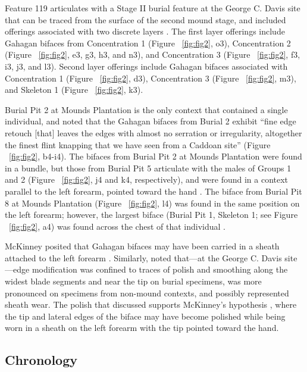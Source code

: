 \documentclass[review]{elsarticle}
\begin{document}
Feature 119 \citep[Figure 13-18]{RN808} articulates with a Stage II burial feature at the George C. Davis site that can be traced from the surface of the second mound stage, and included offerings associated with two discrete layers \citep{RN808,RN5050,RN806}. The first layer offerings include Gahagan bifaces from Concentration 1 (Figure ~\ref{fig:fig2}, o3), Concentration 2 (Figure ~\ref{fig:fig2}, e3, g3, h3, and n3), and Concentration 3 (Figure ~\ref{fig:fig2}, f3, i3, j3, and l3). Second layer offerings include Gahagan bifaces associated with Concentration 1 (Figure ~\ref{fig:fig2}, d3), Concentration 3 (Figure ~\ref{fig:fig2}, m3), and Skeleton 1 (Figure ~\ref{fig:fig2}, k3). 

Burial Pit 2 at Mounds Plantation is the only context that contained a single individual, and \citet[97]{RN11561} noted that the Gahagan bifaces from Burial 2 exhibit “fine edge retouch [that] leaves the edges with almost no serration or irregularity, altogether the finest flint knapping that we have seen from a Caddoan site” (Figure ~\ref{fig:fig2}, b4-i4). The bifaces from Burial Pit 2 at Mounds Plantation were found in a bundle, but those from Burial Pit 5 articulate with the males of Groups 1 and 2 (Figure ~\ref{fig:fig2}, j4 and k4, respectively), and were found in a context parallel to the left forearm, pointed toward the hand \citep[Figure 5]{RN11561}. The biface from Burial Pit 8 at Mounds Plantation (Figure ~\ref{fig:fig2}, l4) was found in the same position on the left forearm; however, the largest biface (Burial Pit 1, Skeleton 1; see Figure ~\ref{fig:fig2}, a4) was found across the chest of that individual \citep{RN11561}.

McKinney posited that Gahagan bifaces may have been carried in a sheath attached to the left forearm \citep{RN11561}. Similarly, \citet{RN3684} noted that---at the George C. Davis site---edge modification was confined to traces of polish and smoothing along the widest blade segments and near the tip on burial specimens, was more pronounced on specimens from non-mound contexts, and possibly represented sheath wear. The polish that \citet{RN3684} discussed supports McKinney’s hypothesis \citep{RN11561}, where the tip and lateral edges of the biface may have become polished while being worn in a sheath on the left forearm with the tip pointed toward the hand.

\subsection*{Chronology}
\end{document}
